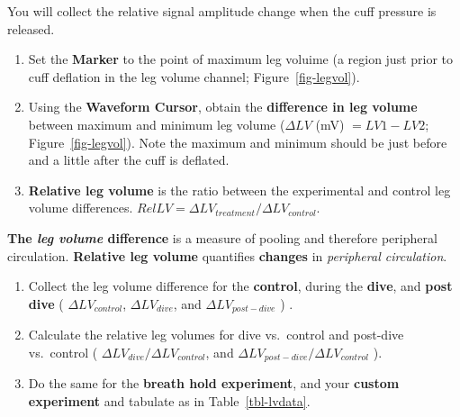 \documentclass[
  letterpaper,
  DIV=11,
  numbers=noendperiod,
  oneside]{scrartcl}
\providecommand{\tightlist}{%
  \setlength{\itemsep}{0pt}\setlength{\parskip}{0pt}}\usepackage{longtable,booktabs,array}
\begin{document}
\begin{tcolorbox}[enhanced jigsaw, opacityback=0, colbacktitle=quarto-callout-tip-color!10!white, opacitybacktitle=0.6, colback=white, leftrule=.75mm, title=\textcolor{quarto-callout-tip-color}{\faLightbulb}\hspace{0.5em}{Collecting leg volume change from the volume trace:}, breakable, rightrule=.15mm, colframe=quarto-callout-tip-color-frame, bottomrule=.15mm, bottomtitle=1mm, arc=.35mm, toptitle=1mm, titlerule=0mm, toprule=.15mm, left=2mm, coltitle=black]

You will collect the relative signal amplitude change when the cuff
pressure is released.

\begin{enumerate}
\def\labelenumi{\arabic{enumi}.}
\tightlist
\item
  Set the \textbf{Marker} to the point of maximum leg voluime (a region
  just prior to cuff deflation in the leg volume channel;
  Figure~\ref{fig-legvol}).
\item
  Using the \textbf{Waveform Cursor}, obtain the \textbf{difference in
  leg volume} between maximum and minimum leg volume (\(\Delta LV\) (mV)
  \(= LV1 - LV2\); Figure~\ref{fig-legvol}). Note the maximum and
  minimum should be just before and a little after the cuff is deflated.
\item
  \textbf{Relative leg volume} is the ratio between the experimental and
  control leg volume differences.
  \(Rel LV = \Delta LV_{treatment} / \Delta LV_{control}\).
\end{enumerate}

\textbf{The \emph{leg volume} difference} is a measure of pooling and
therefore peripheral circulation. \textbf{Relative leg volume}
quantifies \textbf{changes} in \emph{peripheral circulation}.

\end{tcolorbox}

\begin{enumerate}
\def\labelenumi{\arabic{enumi}.}
\tightlist
\item
  Collect the leg volume difference for the \textbf{control}, during the
  \textbf{dive}, and \textbf{post dive} ( \(\Delta LV_{control}\),
  \(\Delta LV_{dive}\), and \(\Delta LV_{post-dive}\) ) .
\item
  Calculate the relative leg volumes for dive vs.~control and post-dive
  vs.~control ( \(\Delta LV_{dive}/ \Delta LV_{control}\), and
  \(\Delta LV_{post-dive}/ \Delta LV_{control}\) ).
\item
  Do the same for the \textbf{breath hold experiment}, and your
  \textbf{custom experiment} and tabulate as in Table~\ref{tbl-lvdata}.
\end{enumerate}
\end{document}
